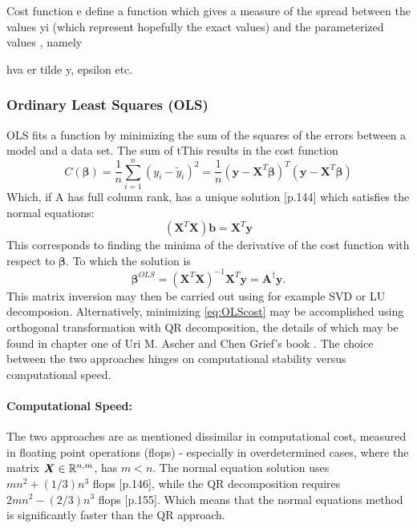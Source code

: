 \documentclass[%
oneside,                 %
final,                   %
10pt]{article}
\begin{document}
Cost function e define a function which gives a measure of the spread between the values yi (which represent hopefully the exact values) and the parameterized values , namely

hva er tilde y, epsilon etc.

\subsubsection{Ordinary Least Squares (OLS)}
OLS fits a function by minimizing the sum of the squares of the errors between a model and a data set. The sum of tThis results in the cost function
\begin{equation}
C(\bm{\beta})=\frac{1}{n}\sum_{i=1}^n(y_i-\tilde{y}_i)^2=\frac{1}{n}(\bm{y}-\bm{X}^T\bm{\beta})^T(\bm{y}-\bm{X}^T\bm{\beta})
\label{eq:OLScost}
\end{equation}
Which, if A has full column rank, has a unique solution \citep{Ascher}[p.144] which satisfies the normal equations:
\begin{equation}
(\bm{X}^T\bm{X})\bm{b}=\bm{X}^T \bm{y}
\label{eq:normeq}
\end{equation}
This corresponds to finding the minima of the derivative of the cost function with respect to $\bm{\beta}$. To which the solution is \begin{equation}
\bm{\beta}^{OLS}= (\bm{X}^T\bm{X})^{-1}\bm{X}^T \bm{y}=\bm{A}^{\dagger}\bm{y}.
\end{equation}
This matrix inversion may then be carried out using for example SVD or LU decomposion. Alternatively, minimizing \eqref{eq:OLScost} may be accomplished using orthogonal transformation with QR decomposition, the details of which may be found in chapter one of Uri M. Ascher and Chen Grief's book  \cite{Ascher}. The choice between the two approaches hinges on computational stability versus computational speed.

\paragraph*{Computational Speed:}
The two approaches are as mentioned dissimilar in computational cost, measured in floating point operations (flops) - especially in overdetermined cases, where the matrix $\bm{X}\in {\Bbb R}^{n,m}$, has $m<n$.
The normal equation solution uses $mn^2
+ (1/3)n^3$ flops \citep{Ascher}[p.146], while the QR decomposition requires $2mn^2−(2/3)n^3$ flops  \citep{Ascher}[p.155]. Which means that the normal equations method is significantly faster than the QR approach.
\end{document}
